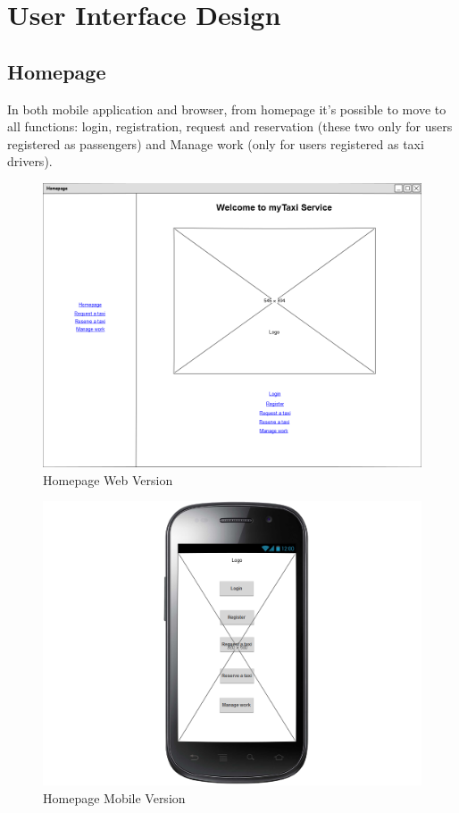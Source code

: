 
\break
\section{User Interface Design}
\subsection{Homepage}
In both mobile application and browser, from homepage it's possible to move to all functions: login, registration, request and reservation (these two only for users registered as passengers) and Manage work (only for users registered as taxi drivers).
\begin{figure}[H]
\centering
\includegraphics[scale=0.3]{mockups/homepage_web.png}
\caption{Homepage Web Version}
\end{figure}
\begin{figure}[H]
\centering
\includegraphics[scale=0.3]{mockups/homepage_mobile.png}
\caption{Homepage Mobile Version}
\end{figure}
\break
